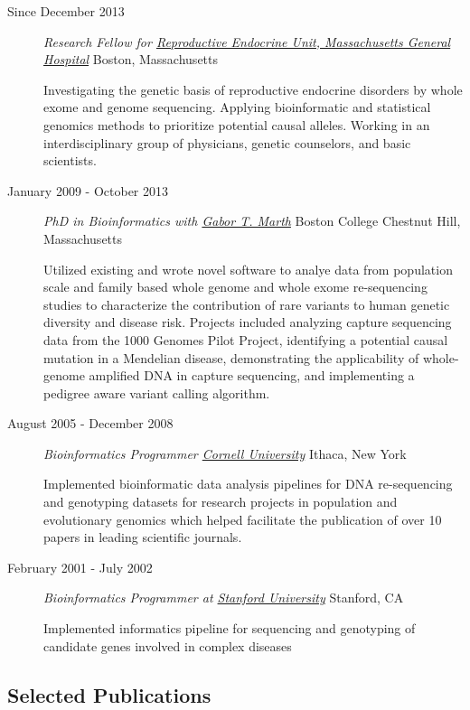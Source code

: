 \documentclass[]{article}
\begin{document}
\begin{description}
\item[Since December 2013]
\emph{Research Fellow for
\href{http://www.massgeneral.org/reproductiveendocrine//}{Reproductive
Endocrine Unit, Massachusetts General Hospital}} Boston, Massachusetts

Investigating the genetic basis of reproductive endocrine disorders
by whole exome and genome sequencing. Applying bioinformatic and statistical genomics 
methods to prioritize potential causal alleles. Working in an interdisciplinary group of physicians, genetic counselors,
and basic scientists. 
\item[January 2009 - October 2013]
\emph{PhD in Bioinformatics with
\href{http://bioinformatics.bc.edu/marthlab/wiki/index.php/Main_Page}{Gabor
T. Marth}} Boston College Chestnut Hill, Massachusetts

Utilized existing and wrote novel software to analye data from
population scale and family based whole genome and whole exome
re-sequencing studies to characterize the contribution of rare variants
to human genetic diversity and disease risk. Projects included
analyzing capture sequencing data from the 1000 Genomes Pilot Project, identifying a potential
causal mutation in a Mendelian disease, demonstrating the applicability of whole-genome amplified DNA
in capture sequencing, and implementing a pedigree aware variant calling algorithm. 

\item[August 2005 - December 2008]
\emph{Bioinformatics Programmer \href{http://www.cornell.edu/}{Cornell
University}} Ithaca, New York

Implemented bioinformatic data analysis pipelines for DNA re-sequencing
and genotyping datasets for research projects in population and
evolutionary genomics which helped facilitate the publication of over 10
papers in leading scientific journals.
\item[February 2001 - July 2002]
\emph{Bioinformatics Programmer at
\href{http://www.stanford.edu}{Stanford University}} Stanford, CA

Implemented informatics pipeline for sequencing and genotyping of
candidate genes involved in complex diseases
\end{description}

\subsection{Selected Publications}\label{selected-publications}
\end{document}
